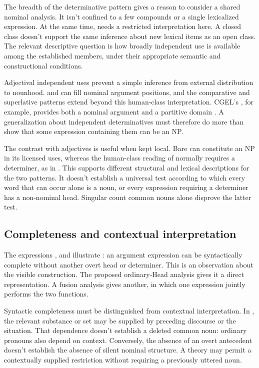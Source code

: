 \documentclass[12pt]{article}
\begin{document}
The breadth of the determinative pattern gives a reason to consider a shared nominal analysis. It isn't confined to a few compounds or a single lexicalized expression. At the same time,  needs a restricted interpretation here. A closed class doesn't support the same inference about new lexical items as an open class. The relevant descriptive question is how broadly independent use is available among the established members, under their appropriate semantic and constructional conditions.

Adjectival independent uses prevent a simple inference from external distribution to nounhood.  and  can fill nominal argument positions, and the comparative and superlative patterns extend beyond this human-class interpretation. CGEL's , for example, provides both a nominal argument and a partitive domain \citep[332--333, 416--423]{huddleston2002}. A generalization about independent determinatives must therefore do more than show that some expression containing them can be an NP.

The contrast with adjectives is useful when kept local. Bare  can constitute an NP in its licensed uses, whereas the human-class reading of  normally requires a determiner, as in . This supports different structural and lexical descriptions for the two patterns. It doesn't establish a universal test according to which every word that can occur alone is a noun, or every expression requiring a determiner has a non-nominal head. Singular count common nouns alone disprove the latter test.

\subsection{Completeness and contextual interpretation}

The expressions ,  and  illustrate : an argument expression can be syntactically complete without another overt head or determiner. This is an observation about the visible construction. The proposed ordinary-Head analysis gives it a direct representation. A fusion analysis gives another, in which one expression jointly performs the two functions.

Syntactic completeness must be distinguished from contextual interpretation. In , the relevant substance or set may be supplied by preceding discourse or the situation. That dependence doesn't establish a deleted common noun: ordinary pronouns also depend on context. Conversely, the absence of an overt antecedent doesn't establish the absence of silent nominal structure. A theory may permit a contextually supplied restriction without requiring a previously uttered noun.
\end{document}
